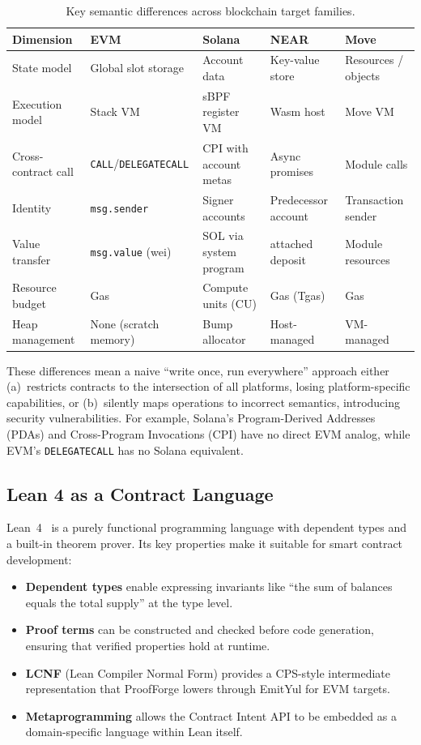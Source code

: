 \documentclass[sigconf]{acmart}
\newcommand{\ttab}{\scriptsize}
\begin{document}
\begin{table}[t]
  \caption{Key semantic differences across blockchain target families.}
  \label{tab:diffs}
  \centering
  \ttab
  \begin{tabularx}{\textwidth}{l X X X X}
    \toprule
    \bfseries Dimension & \bfseries EVM & \bfseries Solana & \bfseries NEAR & \bfseries Move \\
    \midrule
    State model & Global slot storage & Account data & Key-value store & Resources / objects \\
    Execution model & Stack VM & sBPF register VM & Wasm host & Move VM \\
    Cross-contract call & \texttt{CALL}/\texttt{DELEGATECALL} & CPI with account metas & Async promises & Module calls \\
    Identity & \texttt{msg.sender} & Signer accounts & Predecessor account & Transaction sender \\
    Value transfer & \texttt{msg.value} (wei) & SOL via system program & \noindent attached deposit & Module resources \\
    Resource budget & Gas & Compute units (CU) & Gas (Tgas) & Gas \\
    Heap management & None (scratch memory) & Bump allocator & Host-managed & VM-managed \\
    \bottomrule
  \end{tabularx}
\end{table}

These differences mean a naive ``write once, run everywhere'' approach either (a)~restricts
contracts to the intersection of all platforms, losing platform-specific capabilities, or
(b)~silently maps operations to incorrect semantics, introducing security vulnerabilities. For
example, Solana's Program-Derived Addresses (PDAs) and Cross-Program Invocations (CPI) have no
direct EVM analog, while EVM's \texttt{DELEGATECALL} has no Solana equivalent.

\subsection{Lean 4 as a Contract Language}

Lean~4~\cite{lean4} is a purely functional programming language with dependent types and a
built-in theorem prover. Its key properties make it suitable for smart contract development:
\begin{itemize}[leftmargin=*]
  \item \textbf{Dependent types} enable expressing invariants like ``the sum of balances equals
  the total supply'' at the type level.
  \item \textbf{Proof terms} can be constructed and checked before code generation, ensuring
  that verified properties hold at runtime.
  \item \textbf{LCNF} (Lean Compiler Normal Form) provides a CPS-style intermediate
  representation that ProofForge lowers through EmitYul for EVM targets.
  \item \textbf{Metaprogramming} allows the Contract Intent API to be embedded as a
  domain-specific language within Lean itself.
\end{itemize}
\end{document}
